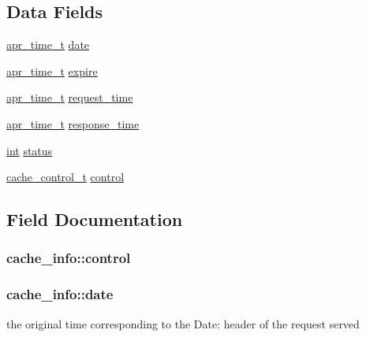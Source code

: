 \subsection*{Data Fields}
\begin{DoxyCompactItemize}
\item 
\hyperlink{group__apr__time_gadb4bde16055748190eae190c55aa02bb}{apr\+\_\+time\+\_\+t} \hyperlink{structcache__info_a25cd61e421d08b30595f6373d230f95f}{date}
\item 
\hyperlink{group__apr__time_gadb4bde16055748190eae190c55aa02bb}{apr\+\_\+time\+\_\+t} \hyperlink{structcache__info_acad1125058221e40207cc515f294d474}{expire}
\item 
\hyperlink{group__apr__time_gadb4bde16055748190eae190c55aa02bb}{apr\+\_\+time\+\_\+t} \hyperlink{structcache__info_acb92f8dc9faf851f946e958a0274cd05}{request\+\_\+time}
\item 
\hyperlink{group__apr__time_gadb4bde16055748190eae190c55aa02bb}{apr\+\_\+time\+\_\+t} \hyperlink{structcache__info_acc033d51cff12d80bb7a58a97d50cf1a}{response\+\_\+time}
\item 
\hyperlink{pcre_8txt_a42dfa4ff673c82d8efe7144098fbc198}{int} \hyperlink{structcache__info_a75f7c612cf3860fa84fbadb0083d2194}{status}
\item 
\hyperlink{group__Cache__cache_ga974ed8fda97372a8db4010093bf933c2}{cache\+\_\+control\+\_\+t} \hyperlink{structcache__info_ad13eba54e179bd5b57b7e97b219b3c67}{control}
\end{DoxyCompactItemize}


\subsection{Field Documentation}
\subsubsection[{\texorpdfstring{control}{control}}]{ cache\+\_\+info\+::control}\hypertarget{structcache__info_ad13eba54e179bd5b57b7e97b219b3c67}{}\label{structcache__info_ad13eba54e179bd5b57b7e97b219b3c67}
\subsubsection[{\texorpdfstring{date}{date}}]{ cache\+\_\+info\+::date}\hypertarget{structcache__info_a25cd61e421d08b30595f6373d230f95f}{}\label{structcache__info_a25cd61e421d08b30595f6373d230f95f}
the original time corresponding to the \textquotesingle{}Date\+:\textquotesingle{} header of the request served 
